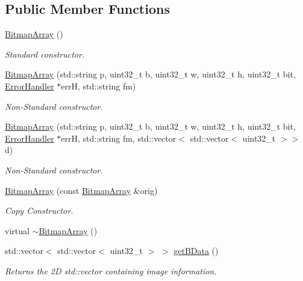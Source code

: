 \subsection*{Public Member Functions}
\begin{DoxyCompactItemize}
\item 
\mbox{\hyperlink{classBitmapArray_a582e5e54ec078d30fde87ae7b4540f32}{Bitmap\+Array}} ()
\begin{DoxyCompactList}\small\item\em Standard constructor. \end{DoxyCompactList}\item 
\mbox{\hyperlink{classBitmapArray_ae11059a1f2f1af199d0a2cf6f316397d}{Bitmap\+Array}} (std\+::string p, uint32\+\_\+t b, uint32\+\_\+t w, uint32\+\_\+t h, uint32\+\_\+t bit, \mbox{\hyperlink{classErrorHandler}{Error\+Handler}} $\ast$errH, std\+::string fm)
\begin{DoxyCompactList}\small\item\em Non-\/\+Standard constructor. \end{DoxyCompactList}\item 
\mbox{\hyperlink{classBitmapArray_afc98bc8debfd35e9ad09df5c126cdd7f}{Bitmap\+Array}} (std\+::string p, uint32\+\_\+t b, uint32\+\_\+t w, uint32\+\_\+t h, uint32\+\_\+t bit, \mbox{\hyperlink{classErrorHandler}{Error\+Handler}} $\ast$errH, std\+::string fm, std\+::vector$<$ std\+::vector$<$ uint32\+\_\+t $>$$>$ d)
\begin{DoxyCompactList}\small\item\em Non-\/\+Standard constructor. \end{DoxyCompactList}\item 
\mbox{\hyperlink{classBitmapArray_a07ce0273af824a8deff592ef1a43d7e5}{Bitmap\+Array}} (const \mbox{\hyperlink{classBitmapArray}{Bitmap\+Array}} \&orig)
\begin{DoxyCompactList}\small\item\em Copy Constructor. \end{DoxyCompactList}\item 
virtual \mbox{\hyperlink{classBitmapArray_acc21c3148de08fb85d2939821f9f2cf0}{$\sim$\+Bitmap\+Array}} ()
\item 
std\+::vector$<$ std\+::vector$<$ uint32\+\_\+t $>$ $>$ \mbox{\hyperlink{classBitmapArray_a66bd389c357de601df924569a0b38429}{get\+B\+Data}} ()
\begin{DoxyCompactList}\small\item\em Returns the 2D std\+::vector containing image information. \end{DoxyCompactList}\item 
$$
\end{DoxyCompactItemize}
